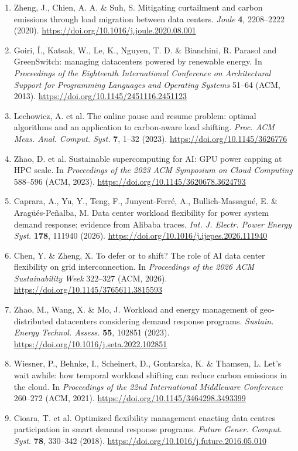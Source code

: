 \documentclass[10pt,a4paper]{article}
\begin{document}
\begin{enumerate}[label=\arabic*.,leftmargin=*,itemsep=4pt]
\item Zheng, J., Chien, A. A. \& Suh, S. Mitigating curtailment and carbon emissions through load migration between data centers. \emph{Joule} \textbf{4}, 2208–2222 (2020). \url{https://doi.org/10.1016/j.joule.2020.08.001}
\item Goiri, Í., Katsak, W., Le, K., Nguyen, T. D. \& Bianchini, R. Parasol and GreenSwitch: managing datacenters powered by renewable energy. In \emph{Proceedings of the Eighteenth International Conference on Architectural Support for Programming Languages and Operating Systems} 51–64 (ACM, 2013). \url{https://doi.org/10.1145/2451116.2451123}
\item Lechowicz, A. et al. The online pause and resume problem: optimal algorithms and an application to carbon-aware load shifting. \emph{Proc. ACM Meas. Anal. Comput. Syst.} \textbf{7}, 1–32 (2023). \url{https://doi.org/10.1145/3626776}
\item Zhao, D. et al. Sustainable supercomputing for AI: GPU power capping at HPC scale. In \emph{Proceedings of the 2023 ACM Symposium on Cloud Computing} 588–596 (ACM, 2023). \url{https://doi.org/10.1145/3620678.3624793}
\item Caprara, A., Yu, Y., Teng, F., Junyent-Ferré, A., Bullich-Massagué, E. \& Aragüés-Peñalba, M. Data center workload flexibility for power system demand response: evidence from Alibaba traces. \emph{Int. J. Electr. Power Energy Syst.} \textbf{178}, 111940 (2026). \url{https://doi.org/10.1016/j.ijepes.2026.111940}
\item Chen, Y. \& Zheng, X. To defer or to shift? The role of AI data center flexibility on grid interconnection. In \emph{Proceedings of the 2026 ACM Sustainability Week} 322–327 (ACM, 2026). \url{https://doi.org/10.1145/3765611.3815593}
\item Zhao, M., Wang, X. \& Mo, J. Workload and energy management of geo-distributed datacenters considering demand response programs. \emph{Sustain. Energy Technol. Assess.} \textbf{55}, 102851 (2023). \url{https://doi.org/10.1016/j.seta.2022.102851}
\item Wiesner, P., Behnke, I., Scheinert, D., Gontarska, K. \& Thamsen, L. Let's wait awhile: how temporal workload shifting can reduce carbon emissions in the cloud. In \emph{Proceedings of the 22nd International Middleware Conference} 260–272 (ACM, 2021). \url{https://doi.org/10.1145/3464298.3493399}
\item Cioara, T. et al. Optimized flexibility management enacting data centres participation in smart demand response programs. \emph{Future Gener. Comput. Syst.} \textbf{78}, 330–342 (2018). \url{https://doi.org/10.1016/j.future.2016.05.010}

\end{enumerate}
\end{document}
